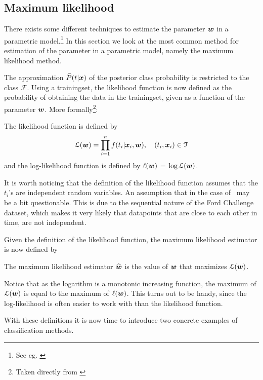 \subsection{Maximum likelihood}
There exists some different techniques to estimate the parameter $\boldsymbol{w}$ in a parametric model.\footnote{See eg. \citet[Sec.9]{wasserman04}} In this section we look at the most common method for estimation of the parameter in a parametric model, namely the maximum likelihood method.\par
The approximation $\widehat{P}(t|\boldsymbol{x})$ of the posterior class probability is restricted to the class $\mathcal{F}$. Using a trainingset, the likelihood function is now defined as the probability of obtaining the data in the trainingset, given as a function of the parameter $\boldsymbol{w}$. More formally\footnote{Taken directly from \citet[p.122]{wasserman04}}:
\begin{definition}
    The likelihood function is defined by
    \[
    \mathcal{L}(\boldsymbol{w}) = \prod_{i=1}^n f(t_i|\boldsymbol{x}_i,\boldsymbol{w}),\quad (t_i,\boldsymbol{x}_i)\in\mathcal{T}
    \]
    and the log-likelihood function is defined by $\ell(\boldsymbol{w})$ = $\log\mathcal{L(\boldsymbol{w})}$.
\end{definition}
It is worth noticing that the definition of the likelihood function assumes that the $t_i$'s are independent random variables. An assumption that in the case of \TFC\ may be a bit questionable. This is due to the sequential nature of the Ford Challenge dataset, which makes it very likely that datapoints that are close to each other in time, are not independent.\par
Given the definition of the likelihood function, the maximum likelihood estimator is now defined by
\begin{definition}
    The maximum likelihood estimator $\widehat{\boldsymbol{w}}$ is the value of $\boldsymbol{w}$ that maximizes $\mathcal{L}(\boldsymbol{w})$.
\end{definition}
Notice that as the logarithm is a monotonic increasing function, the maximum of $\mathcal{L}(\boldsymbol{w})$ is equal to the maximum of $\ell(\boldsymbol{w})$. This turns out to be handy, since the log-likelihood is often easier to work with than the likelihood function. \par
With these definitions it is now time to introduce two concrete examples of classification methods.



